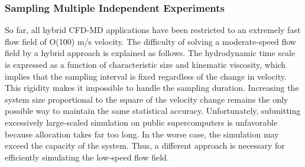 \documentclass[preprint,12pt]{elsarticle}
\begin{document}
\subsubsection{Sampling Multiple Independent Experiments}
\label{sec:numerical_lowspeed}

So far, all hybrid CFD-MD applications have been restricted to an extremely fast flow field of O(100) m/s velocity. The difficulty of solving a moderate-speed flow field by a hybrid approach is explained as follows. The hydrodynamic time scale is expressed as a function of characteristic size and kinematic viscosity, which implies that the sampling interval is fixed regardless of the change in velocity. This rigidity makes it impossible to handle the sampling duration. Increasing the system size proportional to the square of the velocity change remains the only possible way to maintain the same statistical accuracy. Unfortunately, submitting excessively large-scaled simulation on public supercomputers is unfavorable because allocation takes far too long. In the worse case, the simulation may exceed the capacity of the system. Thus, a different approach is necessary for efficiently simulating the low-speed flow field.


\end{document}
